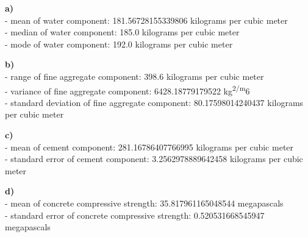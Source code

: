 \documentclass[
]{article}
\begin{document}
\textbf{a)}\\
- mean of water component: 181.56728155339806 kilograms per cubic meter\\
- median of water component: 185.0 kilograms per cubic meter\\
- mode of water component: 192.0 kilograms per cubic meter

\textbf{b)}\\
- range of fine aggregate component: 398.6 kilograms per cubic meter\\
- variance of fine aggregate component: 6428.18779179522 kg\textsuperscript{2/m}6\\
- standard deviation of fine aggregate component: 80.17598014240437 kilograms per cubic meter

\textbf{c)}\\
- mean of cement component: 281.16786407766995 kilograms per cubic meter\\
- standard error of cement component: 3.2562978889642458 kilograms per cubic meter

\textbf{d)}\\
- mean of concrete compressive strength: 35.817961165048544 megapascals\\
- standard error of concrete compressive strength: 0.520531668545947 megapascals
\end{document}

